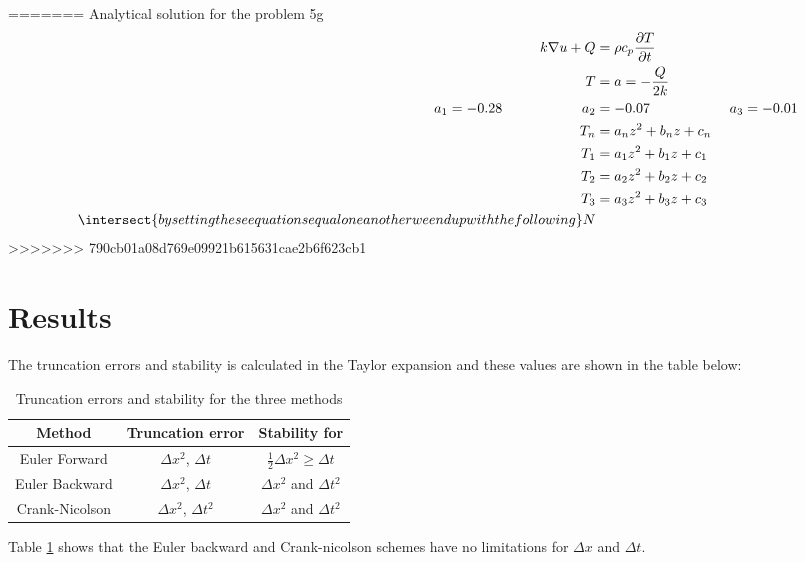 \documentclass[10pt,a4paper]{article}
\begin{document}
=======
Analytical solution for the problem 5g
\begin{align}
k\nabla u + Q &= \rho c_p \frac{\partial T}{\partial t}\\
T &= a = -\frac{Q}{2k}\\ %
a_1 = -0.28 \hspace{2cm} a_2 &= -0.07 \hspace{2cm} a_3 = -0.01\\
T_n &= a_nz^2 + b_nz +c_n\\
T_1 &= a_1z^2 + b_1z +c_1\\
T_2 &= a_2z^2 + b_2z +c_2\\
T_3 &= a_3z^2 + b_3z +c_3\\
\intersect{by setting these equations equal one another we end up with the following}
N
\end{align}
>>>>>>> 790cb01a08d769e09921b615631cae2b6f623cb1




\newpage
\section*{Results}


\noindent The truncation errors and stability is calculated in the Taylor expansion and these values are shown in the table below:


\begin{table}[H]
\centering
\begin{tabular}{|c|c|c|}
\hline
Method & Truncation error & Stability for\\
\hline
Euler Forward & $\Delta x^2$, $\Delta t$ & $\frac{1}{2} \Delta x^2 \geq \Delta t$\\
\hline
Euler Backward & $\Delta x^2$, $\Delta t$ & $\Delta x^2$ and $\Delta t^2$\\
\hline
Crank-Nicolson & $\Delta x^2$, $\Delta t^2$ & $\Delta x^2$ and $\Delta t^2$\\
\hline
\end{tabular}
\caption{Truncation errors and stability for the three methods}
\label{truncstab}
\end{table}
 

\noindent Table \ref{truncstab} shows that the Euler backward and Crank-nicolson schemes have no limitations for $\Delta x$ and $\Delta t$. 
\end{document}
